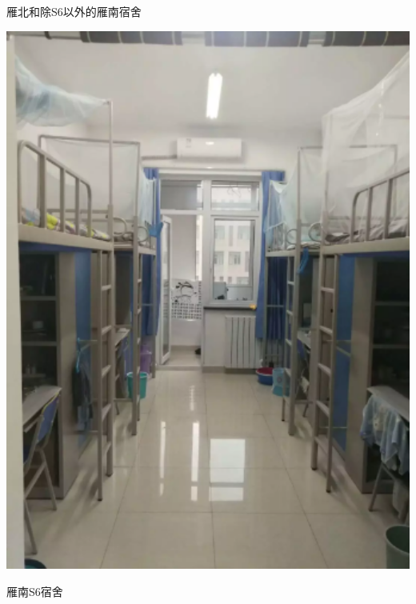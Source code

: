 \begin{center}
    \begin{minipage}{0.45\textwidth}
        \centerline{\fangsong\small 雁北和除S6以外的雁南宿舍}
        \centerline{\includegraphics[width=1\textwidth]{images/dorm.png}}
    \end{minipage}
    \qquad
    \begin{minipage}{0.45\textwidth}
        \centerline{\fangsong\small 雁南S6宿舍}

\end{minipage}
\end{center}
